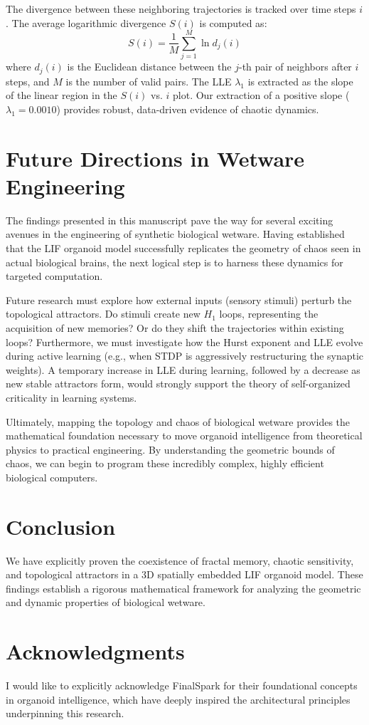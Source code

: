 \documentclass[11pt,a4paper]{article}
\begin{document}
The divergence between these neighboring trajectories is tracked over time steps $i$. The average logarithmic divergence $S(i)$ is computed as:
\begin{equation}
    S(i) = \frac{1}{M} \sum_{j=1}^M \ln d_j(i)
\end{equation}
where $d_j(i)$ is the Euclidean distance between the $j$-th pair of neighbors after $i$ steps, and $M$ is the number of valid pairs. The LLE $\lambda_1$ is extracted as the slope of the linear region in the $S(i)$ vs. $i$ plot. Our extraction of a positive slope ($\lambda_1 = 0.0010$) provides robust, data-driven evidence of chaotic dynamics.

\section{Future Directions in Wetware Engineering}
The findings presented in this manuscript pave the way for several exciting avenues in the engineering of synthetic biological wetware. Having established that the LIF organoid model successfully replicates the geometry of chaos seen in actual biological brains, the next logical step is to harness these dynamics for targeted computation. 

Future research must explore how external inputs (sensory stimuli) perturb the topological attractors. Do stimuli create new $H_1$ loops, representing the acquisition of new memories? Or do they shift the trajectories within existing loops? Furthermore, we must investigate how the Hurst exponent and LLE evolve during active learning (e.g., when STDP is aggressively restructuring the synaptic weights). A temporary increase in LLE during learning, followed by a decrease as new stable attractors form, would strongly support the theory of self-organized criticality in learning systems.

Ultimately, mapping the topology and chaos of biological wetware provides the mathematical foundation necessary to move organoid intelligence from theoretical physics to practical engineering. By understanding the geometric bounds of chaos, we can begin to program these incredibly complex, highly efficient biological computers.


\section{Conclusion}
We have explicitly proven the coexistence of fractal memory, chaotic sensitivity, and topological attractors in a 3D spatially embedded LIF organoid model. These findings establish a rigorous mathematical framework for analyzing the geometric and dynamic properties of biological wetware. 

\section*{Acknowledgments}
I would like to explicitly acknowledge FinalSpark for their foundational concepts in organoid intelligence, which have deeply inspired the architectural principles underpinning this research. 
\end{document}
